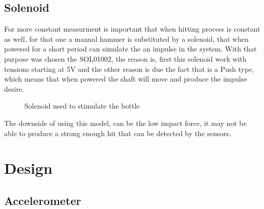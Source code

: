 \subsection{Solenoid}
For more constant measurment is important that when hitting process is constant as well, for that one a manual hammer is substituted by a solenoid, that when powered for a short period can simulate the an impulse in the system. With that purpose was chosen the SOL01002, the reason is, first this solenoid work with tensions starting at 5V and the other reason is due the fact that is a Push type, which means that when powered the shaft will move and produce the impulse desire.
\begin{figure}[!htb]
    \centering
    \caption{Solenoid used to stimulate the bottle}
    \label{fig:solenoid}
\end{figure}
The downside of using this model, can be the low impact force, it may not be able to produce a strong enough hit that can be detected by the sensors.
\section{Design}
\subsection{Accelerometer}
